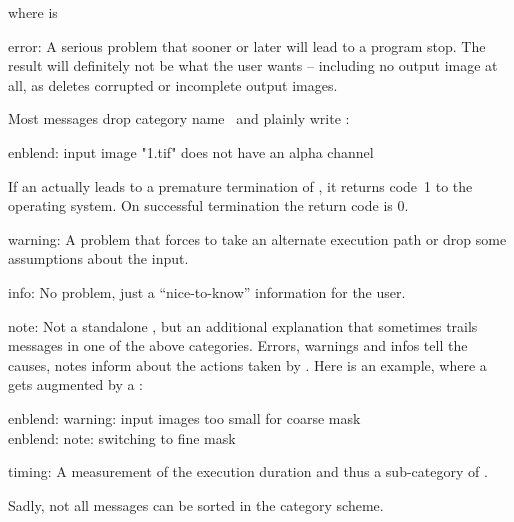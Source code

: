 \noindent where  is

\begin{codelist}
\item[error:] A serious problem that sooner or later will lead to a program stop.  The result
  will definitely not be what the user wants -- including no output image at all, as \appcmd{}
  deletes corrupted or incomplete output images.

  Most messages drop category name~ and plainly write :

  \begin{literal}
    enblend: input image "1.tif" does not have an alpha channel
  \end{literal}

  If an  actually leads to a
  premature termination of \appcmd, it returns code~1 to the operating system.  On successful
  termination the return code is 0.

\item[warning:] A problem that forces \appcmd{} to take an alternate execution path or drop some
  assumptions about the input.

\item[info:] No problem, just a ``nice-to-know'' information for the user.

\item[note:] Not a standalone , but an additional explanation that sometimes
  trails messages in one of the above categories.  Errors, warnings and infos tell the causes,
  notes inform about the actions taken by \appcmd{}.  Here is an example, where a 
  gets augmented by a :

  \begin{literal}
    enblend: warning: input images too small for coarse mask \\
    enblend: note: switching to fine mask
  \end{literal}

\item[timing:] A measurement of the execution duration and thus a sub\hyp{}category of
  .
\end{codelist}

\noindent Sadly, not all messages can be sorted in the category scheme.

